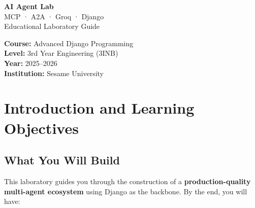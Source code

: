 \documentclass[11pt,a4paper]{article}
\begin{document}
\begin{titlepage}
\thispagestyle{empty}

\vspace*{2.5cm}
{\color{white}\Huge\bfseries AI Agent Lab}\\[0.4em]
{\color{SesameTeal}\Large MCP · A2A · Groq · Django}\\[1em]
{\color{white}\large Educational Laboratory Guide}

\vspace{4cm}

\begin{mdframed}[backgroundcolor=white,linecolor=SesameTeal,linewidth=1pt,roundcorner=4pt]
  \textbf{Course:} Advanced Django Programming\\[0.3em]
  \textbf{Level:} 3rd Year Engineering (3INB)\\[0.3em]
  \textbf{Year:} 2025–2026\\[0.3em]
  \textbf{Institution:} Sesame University
\end{mdframed}

\vspace{1.5cm}
\tableofcontents
\end{titlepage}

\newpage
\section{Introduction and Learning Objectives}

\subsection{What You Will Build}

This laboratory guides you through the construction of a \textbf{production-quality
multi-agent ecosystem} using Django as the backbone. By the end, you will have:
\end{document}

